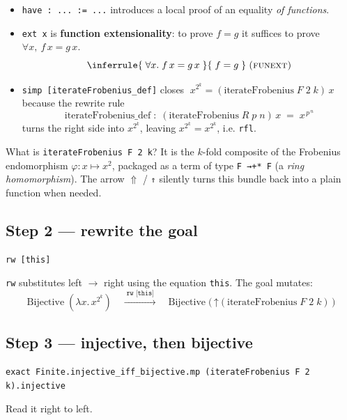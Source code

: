 \documentclass[11pt]{article}
\newcommand{\note}[1]{%
  \par\smallskip
  \noindent\colorbox{leanbg}{\parbox{\dimexpr\linewidth-2\fboxsep}{\small #1}}%
  \par\smallskip}
\begin{document}
\begin{itemize}\itemsep4pt
  \item \texttt{have : ... := ...} introduces a local proof of an equality
        \emph{of functions}.
  \item \texttt{ext x} is \textbf{function extensionality}: to prove $f = g$
        it suffices to prove $\forall x,\ f\,x = g\,x$.
        \[
        \inferrule{\;\forall x.\; f\,x = g\,x\;}{\; f = g \;}\;\textsc{(funext)}
        \]
  \item \texttt{simp [iterateFrobenius\_def]} closes
        $\;x^{2^k} = (\mathrm{iterateFrobenius}\;F\;2\;k)\,x\;$
        because the rewrite rule
        \[
        \mathrm{iterateFrobenius\_def} \;:\;
        (\mathrm{iterateFrobenius}\;R\;p\;n)\,x \;=\; x^{\,p^{\,n}}
        \]
        turns the right side into $x^{2^k}$, leaving $x^{2^k}=x^{2^k}$, i.e. \texttt{rfl}.
\end{itemize}

\note{What is \texttt{iterateFrobenius F 2 k}? It is the $k$-fold composite of the
Frobenius endomorphism $\varphi:x\mapsto x^{2}$, packaged as a term of type
\texttt{F →+* F} (a \emph{ring homomorphism}). The arrow $\Uparrow$ / \texttt{⇑}
silently turns this bundle back into a plain function when needed.}

\bigskip
\subsection*{Step 2 --- rewrite the goal}

\begin{lstlisting}
rw [this]
\end{lstlisting}

\texttt{rw} substitutes left $\to$ right using the equation \texttt{this}.
The goal mutates:
\[
\mathrm{Bijective}\;(\lambda x.\,x^{2^k})
\quad\xrightarrow{\;\texttt{rw [this]}\;}\quad
\mathrm{Bijective}\;\bigl(\,\mathord{\uparrow}(\mathrm{iterateFrobenius}\;F\;2\;k)\,\bigr)
\]

\bigskip
\subsection*{Step 3 --- injective, then bijective}

\begin{lstlisting}
exact Finite.injective_iff_bijective.mp (iterateFrobenius F 2 k).injective
\end{lstlisting}

Read it right to left.
\end{document}
